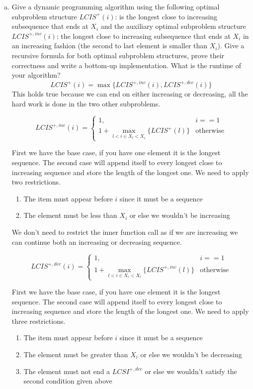 \documentclass{article}
\begin{document}
\begin{enumerate}[a)]
\item Give a dynamic programming algorithm using the following optimal subproblem structure $LCIS^{+}(i)$: is the longest close to increasing subsequence that ends at $X_i$ and the auxiliary optimal subproblem structure $LCIS^{+,inc}(i)$: the longest close to increasing subsequence that ends at $X_i$ in an increasing fashion (the second to last element is smaller than $X_i$).
Give a recursive formula for both optimal subproblem structures, prove their correctness and write a bottom-up implementation.
What is the runtime of your algorithm? \\


$$LCIS^+(i) = \max \{LCIS^{+,inc}(i),  LCIS^{+,dec}(i)\}$$
This holds true because we can end on either increasing or decreasing, all the hard work is done in the two other subproblems.

\[
    LCIS^{+,inc}(i) =
\begin{cases}
    1,                                          & i == 1        \\
    1 + \max_{l<i \in X_l<X_i} \{LCIS^+(l)\}    & \text{otherwise}
\end{cases}
\]

First we have the base case, if you have one element it is the longest sequence.
The second case will append itself to every longest close to increasing sequence and store the length of the longest one.
We need to apply two restrictions.
\begin{enumerate}
\item The item must appear before $i$ since it must be a sequence
\item The element must be less than $X_i$ or else we wouldn't be increasing
\end{enumerate}
We don't need to restrict the inner function call as if we are increasing we can continue both an increasing or decreasing sequence.

\[
    LCIS^{+,dec}(i) =
\begin{cases}
    1,                                              & i == 1        \\
    1 + \max_{l<i \in X_i<X_l} \{LCIS^{+,inc}(l)\}  & \text{otherwise}
\end{cases}
\]

First we have the base case, if you have one element it is the longest sequence.
The second case will append itself to every longest close to increasing sequence and store the length of the longest one.
We need to apply three restrictions.
\begin{enumerate}
\item The item must appear before $i$ since it must be a sequence
\item The element must be greater than $X_i$ or else we wouldn't be decreasing
\item The element must not end a $LCSI^{+,dec}$ or else we wouldn't satisfy the second condition given above
\end{enumerate}



\end{enumerate}
\end{document}

